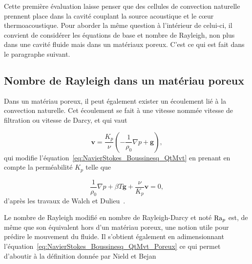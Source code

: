 Cette première évaluation laisse penser que des cellules de convection naturelle prennent place dans la cavité couplant la source acoustique et le c\oe{}ur thermoacoustique. Pour aborder la même question à l'intérieur de celui-ci, il convient de considérer les équations de base et nombre de Rayleigh, non plus dans une cavité fluide mais dans un matériaux poreux. C'est ce qui est fait dans le paragraphe suivant.

%
%
%

\subsection{Nombre de Rayleigh dans un matériau poreux}

Dans un matériau poreux, il peut également exister un écoulement lié à la convection naturelle. Cet écoulement se fait à une vitesse nommée vitesse de filtration ou vitesse de Darcy, et qui vaut

\begin{equation}
	\mathbf v = \frac{K_p}{\nu}\left( -\frac{1}{\rho_0} \nabla p + \mathbf g \right),
	\label{eq:VitesseDarcy}
\end{equation}
qui modifie l'équation~\eqref{eq:NavierStokes_Boussinesq_QtMvt} en prenant en compte la perméabilité $K_p$ telle que

\begin{equation}
	\frac{1}{\rho_0}\nabla p + \beta T \mathbf g + \frac{\nu}{K_p} \mathbf v = 0,
	\label{eq:NavierStokes_Boussinesq_QtMvt_Poreux}
\end{equation}
d'après les travaux de Walch et Dulieu~\cite{walch_convection_1980}.

Le nombre de Rayleigh modifié en nombre de Rayleigh-Darcy et noté $\mathrm{Ra}_p$ est, de même que son équivalent hors d'un matériau poreux, une notion utile pour prédire le mouvement du fluide. Il s'obtient également en adimensionnant l'équation~\eqref{eq:NavierStokes_Boussinesq_QtMvt_Poreux} ce qui permet d'aboutir à la définition donnée par Nield et Bejan~\cite{nield_convection_2013}

